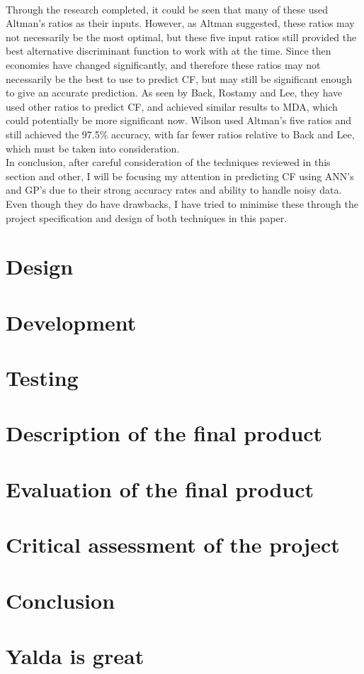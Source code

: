 \documentclass[11pt]{article}
\begin{document}
\\
Through the research completed, it could be seen that many of these used Altman's ratios as their inputs. However, as Altman suggested, these ratios may not necessarily be the most optimal, but these five input ratios still provided the best alternative discriminant function to work with at the time. Since then economies have changed significantly, and therefore these ratios may not necessarily be the best to use to predict CF, but may still be significant enough to give an accurate prediction. As seen by Back, Rostamy and Lee, they have used other ratios to predict CF, and achieved similar results to MDA, which could potentially be more significant now. Wilson used Altman's five ratios and still achieved the 97.5\% accuracy, with far fewer ratios relative to Back and Lee, which must be taken into consideration.\\
In conclusion, after careful consideration of the techniques reviewed in this section and other, I will be focusing my attention in predicting CF using ANN's and GP's due to their strong accuracy rates and ability to handle noisy data. Even though they do have drawbacks, I have tried to minimise these through the project specification and design of both techniques in this paper. 
\\

\newpage
\section{Design}

\newpage
\section{Development}

\newpage
\section{Testing}

\newpage
\section{Description of the final product}

\newpage
\section{Evaluation of the final product}

\newpage
\section{Critical assessment of the project }

\newpage
\section{Conclusion}


\newpage
\section{Yalda is great}
\end{document}
